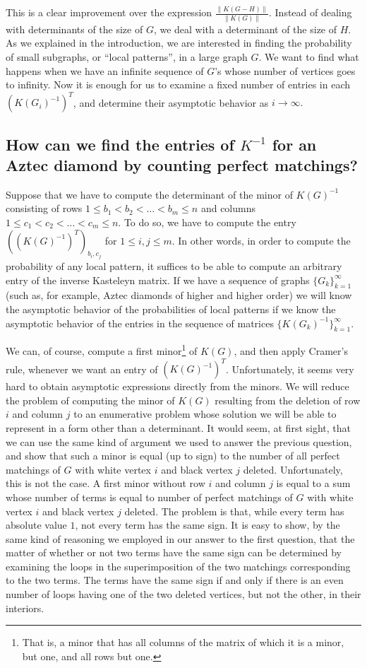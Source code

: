 \documentclass[10pt,reqno]{amsart}
\theoremstyle{plain}
\theoremstyle{definition}
\theoremstyle{remark}
\begin{document}
This is a clear improvement over the
expression $\frac{\|K(G-H)\|}{\|K(G)\|}$. Instead of dealing with determinants
of the size of $G$, we deal with a determinant of the size of $H$.
As we explained in the introduction, we are interested in finding
the probability of small subgraphs, or ``local patterns'', in a large graph 
$G$. We want to find what happens when we have an infinite
sequence of $G$'s whose number of vertices goes to infinity.
Now it is enough for us to examine
a fixed number of entries in each $(K(G_i)^{-1})^T$, and determine their
asymptotic behavior as $i\to \infty.$ 

\subsection{How can we find the entries of $K^{-1}$ for an Aztec diamond
by counting perfect matchings?}

Suppose that we have to compute the determinant of the minor of $K(G)^{-1}$
consisting of rows $1\leq b_1 < b_2 <\dots <b_m\leq n$ and columns
$1\leq c_1 < c_2 <\dots <c_m\leq n$. To do so, we have to compute the
entry $((K(G)^{-1})^T)_{b_i,c_j}$ for $1\leq i,j\leq m$. In other words,
in order to compute the probability of any local pattern, it suffices
to be able to compute an arbitrary entry of the inverse Kasteleyn matrix.
If we have a sequence of graphs $\{G_k\}_{k=1}^\infty$ 
(such as, for example, Aztec diamonds of higher and
higher order) we will know the asymptotic behavior of the probabilities
of local patterns if we know the asymptotic behavior of the entries
in the sequence of matrices $\{K(G_k)^{-1}\}_{k=1}^\infty$.

We can, of course, compute a first minor\footnote{That is, a minor
that has all columns of the matrix of which it is a minor, but one,
and all rows but one.}
 of $K(G)$, and then apply Cramer's
rule, whenever we want an entry of $(K(G)^{-1})^T$.
Unfortunately, it seems very hard
to obtain asymptotic expressions directly from the minors.
We will reduce the problem of computing the minor of $K(G)$
resulting from the deletion of row $i$ and column $j$ to an enumerative
problem whose solution we will be able to represent in a form other than a
determinant.
It would seem, at first sight, that we can use the same
kind of argument we used to answer the previous question, and show
that such a minor is equal (up to sign) to the number of all perfect matchings
of $G$ with white vertex $i$ and black vertex $j$ deleted.
Unfortunately, this is not the case. A first minor without row $i$
and column $j$ is equal to a sum whose number of terms is equal to
number of perfect matchings
of $G$ with white vertex $i$ and black vertex $j$ deleted.       
The problem is that, while every term has absolute value $1$,
not every term has the same sign. It is easy to show, by the same
kind of reasoning we employed in our answer to the first question, that
the matter of whether or not two terms have the same sign can be determined by
examining the loops in the superimposition of the two matchings
corresponding to the two terms. The terms have the same sign
if and only if there is an even number of loops having one of the two deleted
vertices, but not the other, in their interiors. 
\end{document}

